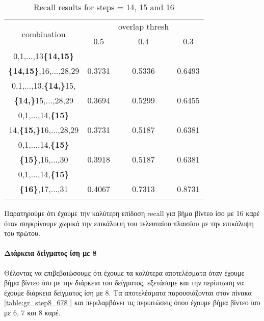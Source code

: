 \begin{center}
  \en
  \begin{longtable}{||c||c c c||}

  \hline
  \multirow{2}{5em}{combination} & {} &overlap thresh & {} \\
                                    &  0.5  &  0.4 &  0.3 \\         
  \hline  \hline
  0,1,...,13\textbf{\{14,15\}}                & {} & {} & {} \\
  \textbf{\{14,15\}},16,...,28,29                & 0.3731 & 0.5336 & 0.6493 \\
  \hline     \hline                          

  0,1,...,13,\textbf{\{14,\}}15,              & {} & {} & {} \\
  \textbf{\{14,\}}15,...,28,29                & 0.3694   & 0.5299 & 0.6455 \\
  \hline                          
  0,1,...,14,\textbf{\{15\}}                  & {} & {} & {} \\
  14,\textbf{\{15,\}}16,...,28,29             & 0.3731   & 0.5187 & 0.6381 \\
  \hline  \hline

  0,1,...,14,\textbf{\{15\}}                & {} & {} & {} \\
  \textbf{\{15\}},16,...,30                 & 0.3918 & 0.5187 & 0.6381 \\
  \hline     \hline                          
  0,1,...,14,\textbf{\{15\}}                & {} & {} & {} \\
  \textbf{\{16\}},17,...,31                 & 0.4067 & 0.7313 & 0.8731 \\
  \hline                          
  \caption{Recall results for steps = 14, 15 and 16}
  \label{table:gr_step14_16}
\end{longtable} 
\end{center}

Παρατηρούμε ότι έχουμε την καλύτερη επίδοση \en recall \gr για βήμα βίντεο ίσο με 16 καρέ όταν συγκρίνουμε
χωρικά την επικάλυψη του τελευταίου πλαισίου με την επικάλυψη του πρώτου.

\paragraph{\gr Διάρκεια δείγματος ίση με 8}

Θέλοντας να επιβεβαιώσουμε ότι έχουμε τα καλύτερα αποτελέσματα όταν έχουμε βήμα βίντεο ίσο με την διάρκεια του δείγματος,
εξετάσαμε και την περίπτωση να έχουμε διάρκεια δείγματος ίση με 8. Τα αποτελέσματα παρουσιάζονται στον πίνακα 
\ref{table:gr_step8_678 } και περιλαμβάνει τις περιπτώσεις όπου έχουμε βήμα βίντεο ίσο με 6, 7 και 8 καρέ.


